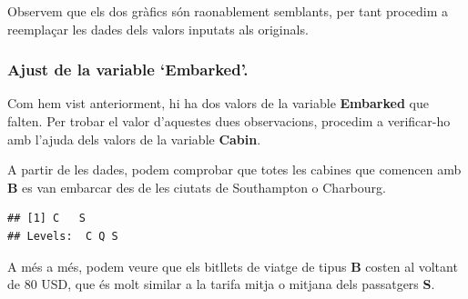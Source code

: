 \documentclass[
]{article}
\newenvironment{Shaded}{\begin{snugshade}}{\end{snugshade}}
\newcommand{\CommentTok}[1]{\textcolor[rgb]{0.50,0.62,0.50}{#1}}
\newcommand{\FunctionTok}[1]{\textcolor[rgb]{0.94,0.94,0.56}{#1}}
\newcommand{\NormalTok}[1]{\textcolor[rgb]{0.80,0.80,0.80}{#1}}
\newcommand{\OtherTok}[1]{\textcolor[rgb]{0.94,0.94,0.56}{#1}}
\newcommand{\SpecialCharTok}[1]{\textcolor[rgb]{0.86,0.64,0.64}{#1}}
\newcommand{\StringTok}[1]{\textcolor[rgb]{0.80,0.58,0.58}{#1}}
\begin{document}
Observem que els dos gràfics són raonablement semblants, per tant
procedim a reemplaçar les dades dels valors inputats als originals.

\begin{Shaded}
\end{Shaded}

\hypertarget{ajust-de-la-variable-embarked.}{%
\subsubsection{Ajust de la variable
`Embarked'.}\label{ajust-de-la-variable-embarked.}}

Com hem vist anteriorment, hi ha dos valors de la variable
\textbf{Embarked} que falten. Per trobar el valor d'aquestes dues
observacions, procedim a verificar-ho amb l'ajuda dels valors de la
variable \textbf{Cabin}.

A partir de les dades, podem comprobar que totes les cabines que
comencen amb \textbf{B} es van embarcar des de les ciutats de
Southampton o Charbourg.

\begin{Shaded}
\end{Shaded}

\begin{verbatim}
## [1] C   S
## Levels:  C Q S
\end{verbatim}

A més a més, podem veure que els bitllets de viatge de tipus \textbf{B}
costen al voltant de 80 USD, que és molt similar a la tarifa mitja o
mitjana dels passatgers \textbf{S}.

\begin{Shaded}
\end{Shaded}
\end{document}
